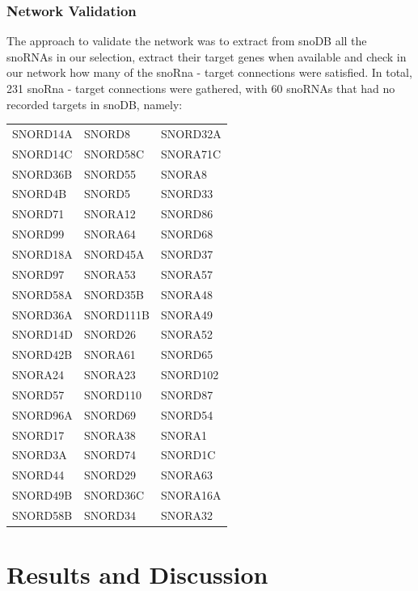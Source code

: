 \documentclass[journal]{IEEEtran}
\begin{document}
\subsubsection{Network Validation}
The approach to validate the network was to extract from snoDB all the snoRNAs in our selection, extract their target genes when available and check in our network how many of the snoRna - target connections were satisfied. In total, 231 snoRna - target connections were gathered, with 60 snoRNAs that had no recorded targets in snoDB, namely:
\begin{center}
    \tablefirsthead{\hline}
    \tablelasttail{\hline}
    \begin{supertabular}{ |l|l|l| }
        SNORD14A & SNORD8 & SNORD32A \\
        SNORD14C & SNORD58C & SNORA71C \\
        SNORD36B & SNORD55 & SNORA8 \\
        SNORD4B & SNORD5 & SNORD33 \\
        SNORD71 & SNORA12 & SNORD86 \\
        SNORD99 & SNORA64 & SNORD68 \\
        SNORD18A & SNORD45A & SNORD37 \\
        SNORD97 & SNORA53 & SNORA57 \\
        SNORD58A & SNORD35B & SNORA48 \\
        SNORD36A & SNORD111B & SNORA49 \\
        SNORD14D & SNORD26 & SNORA52 \\
        SNORD42B & SNORA61 & SNORD65 \\
        SNORA24 & SNORA23 & SNORD102 \\
        SNORD57 & SNORD110 & SNORD87 \\
        SNORD96A & SNORD69 & SNORD54 \\
        SNORD17 & SNORA38 & SNORA1 \\
        SNORD3A & SNORD74 & SNORD1C \\
        SNORD44 & SNORD29 & SNORA63 \\
        SNORD49B & SNORD36C & SNORA16A \\
        SNORD58B & SNORD34 & SNORA32 \\
    \end{supertabular}
\end{center}

\section{Results and Discussion}
\end{document}
